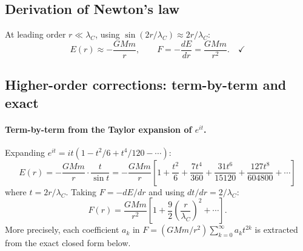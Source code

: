 \documentclass[11pt,a4paper]{article}
\theoremstyle{definition}
\theoremstyle{remark}
\begin{document}
	\subsection{Derivation of Newton's law}

	At leading order $r\ll\lambda_C$, using $\sin(2r/\lambda_C)\approx 2r/\lambda_C$:
	\begin{equation}
		E(r) \approx -\frac{GMm}{r}, \qquad F = -\frac{dE}{dr} = \frac{GMm}{r^2}.\quad\checkmark
	\end{equation}

	\subsection{Higher-order corrections: term-by-term and exact}

	\paragraph{Term-by-term from the Taylor expansion of $e^{it}$.}
	Expanding $e^{it} = it(1 - t^2/6 + t^4/120 - \cdots)$:
	\begin{equation}
		E(r) = -\frac{GMm}{r}\cdot\frac{t}{\sin t}
		     = -\frac{GMm}{r}\!\left[1 + \frac{t^2}{6} + \frac{7t^4}{360}
		       + \frac{31t^6}{15120} + \frac{127t^8}{604800} + \cdots\right]
	\end{equation}
	where $t = 2r/\lambda_C$.  Taking $F=-dE/dr$ and using $dt/dr = 2/\lambda_C$:
	\begin{equation}
		F(r) = \frac{GMm}{r^2}\!\left[1 + \frac{9}{2}\!\left(\frac{r}{\lambda_C}\right)^{\!2}
		      + \cdots\right].
	\end{equation}
	More precisely, each coefficient $a_k$ in
	$F = (GMm/r^2)\sum_{k=0}^\infty a_k t^{2k}$
	is extracted from the exact closed form below.
\end{document}
